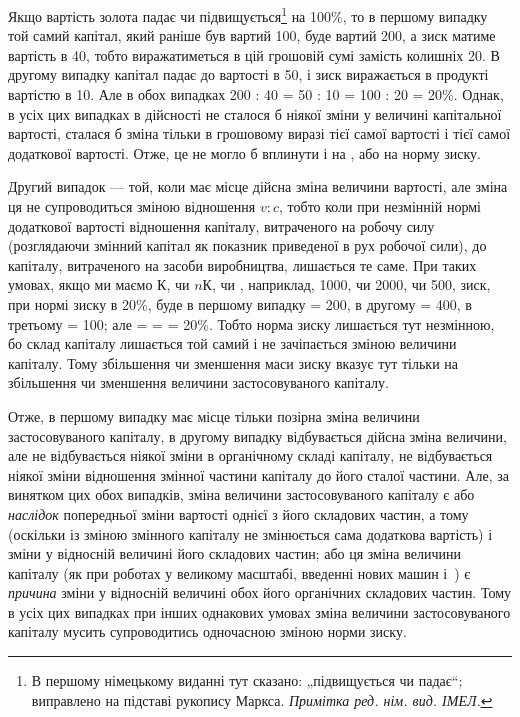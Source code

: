 \parcont{}  %
Якщо вартість золота падає чи підвищується\footnote*{
В першому німецькому виданні тут сказано: „підвищується чи падає“;
виправлено на підставі рукопису Маркса. \emph{Примітка ред. нім. вид. ІМЕЛ.}
} на 100\%, то
в першому випадку той самий капітал, який раніше був вартий
100, буде вартий 200, а зиск
матиме вартість в 40, тобто виражатиметься
в цій грошовій сумі замість колишніх 20.
В другому випадку капітал падає до вартості в 50, і зиск виражається в продукті вартістю в 10. Але в обох випадках 200 : 40 = 50 : 10 = 100 : 20 = 20\%.
Однак, в усіх цих випадках в дійсності не сталося б ніякої
зміни у величині капітальної вартості, сталася б зміна тільки
в грошовому виразі тієї самої вартості і тієї самої додаткової
вартості. Отже, це не могло б вплинути і на , або на норму
зиску.

Другий випадок — той, коли має місце дійсна зміна величини
вартості, але зміна ця не супроводиться зміною відношення
$v : c$, тобто коли при незмінній нормі додаткової вартості відношення
капіталу, витраченого на робочу силу (розглядаючи
змінний капітал як показник приведеної в рух робочої сили), до
капіталу, витраченого на засоби виробництва, лишається те
саме. При таких умовах, якщо ми маємо $К$, чи $nК$, чи , наприклад,
1000, чи 2000, чи 500, зиск, при нормі зиску в 20\%,
буде в першому випадку = 200, в другому = 400, в третьому = 100;
але  =  =  = 20\%. Тобто норма зиску лишається тут
незмінною, бо склад капіталу лишається той самий і не зачіпається
зміною величини капіталу. Тому збільшення чи зменшення
маси зиску вказує тут тільки на збільшення чи зменшення
величини застосовуваного капіталу.

Отже, в першому випадку має місце тільки позірна зміна
величини застосовуваного капіталу, в другому випадку відбувається
дійсна зміна величини, але не відбувається ніякої зміни
в органічному складі капіталу, не відбувається ніякої зміни
відношення змінної частини капіталу до його сталої частини.
Але, за винятком цих обох випадків, зміна величини застосовуваного
капіталу є або \emph{наслідок} попередньої зміни вартості
однієї з його складових частин, а тому (оскільки із зміною змінного
капіталу не змінюється сама додаткова вартість) і зміни
у відносній величині його складових частин; або ця зміна величини
капіталу (як при роботах у великому масштабі, введенні нових
машин і~) є \emph{причина} зміни у відносній величині обох його
органічних складових частин. Тому в усіх цих випадках при
інших однакових умовах зміна величини застосовуваного капіталу
мусить супроводитись одночасною зміною норми зиску.
